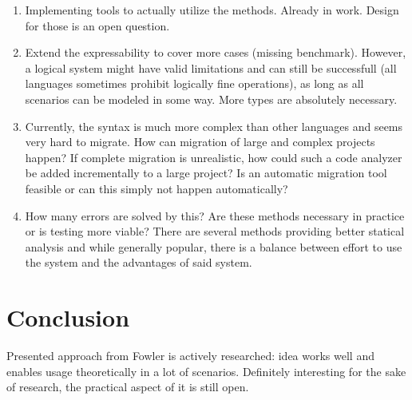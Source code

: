 \begin{enumerate}
    \item Implementing tools to actually utilize the methods. Already in work. Design for those is an open question.
    \item Extend the expressability to cover more cases (missing benchmark). However, a logical system might have valid limitations and can still be successfull (all languages sometimes prohibit logically fine operations), as long as all scenarios can be modeled in some way. More types are absolutely necessary.
    \item Currently, the syntax is much more complex than other languages and seems very hard to migrate. How can migration of large and complex projects happen? If complete migration is unrealistic, how could such a code analyzer be added incrementally to a large project? Is an automatic migration tool feasible or can this simply not happen automatically?
    \item How many errors are solved by this? Are these methods necessary in practice or is testing more viable? There are several methods providing better statical analysis and while generally popular, there is a balance between effort to use the system and the advantages of said system.
\end{enumerate}

    
\section{Conclusion}
\label{sec:conclusions}
    

Presented approach from Fowler is actively researched: idea works well and enables usage theoretically in a lot of scenarios. Definitely interesting for the sake of research, the practical aspect of it is still open.

